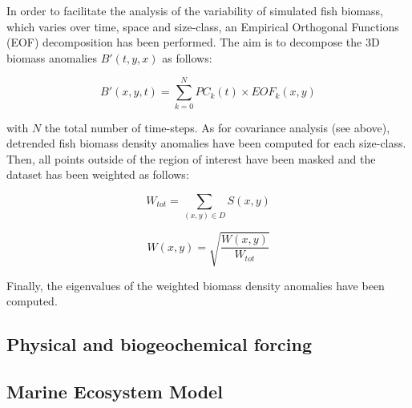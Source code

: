 In order to facilitate the analysis of the variability of simulated fish biomass, which varies over time, space and size-class, an Empirical Orthogonal Functions (EOF) decomposition has been performed. The aim is to decompose the 3D biomass anomalies $B'(t, y, x)$ as follows: 

\begin{equation}
B'(x,y,t) = \sum_{k=0}^{N} PC_k(t) \times EOF_k(x,y)
\end{equation}

with $N$ the total number of time-steps. As for covariance analysis (see above), detrended fish biomass density anomalies have been computed for each size-class. Then, all points outside of the region of interest have been masked and the dataset has been weighted as follows:

\begin{displaymath}
W_{tot} = \sum_{(x, y) \in D} S(x,y)
\end{displaymath}

\begin{displaymath}
W(x, y) = \sqrt{\frac{W(x, y)}{W_{tot}}}
\end{displaymath}

Finally, the eigenvalues of the weighted biomass density anomalies have been computed. 

\subsection{Physical and biogeochemical forcing}


\subsection{Marine Ecosystem Model}
